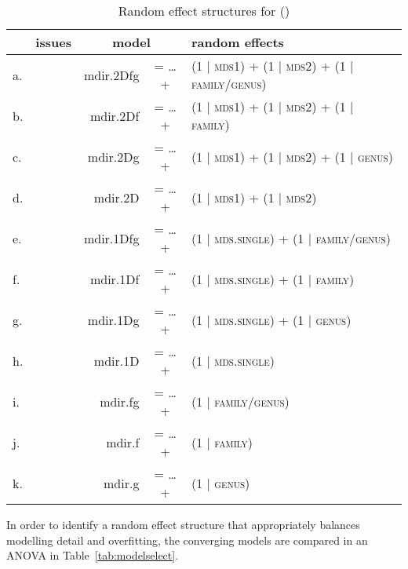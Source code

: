 \documentclass[A4paper]{article}
\begin{document}
\begin{table}[htb!]
\centering
\caption{Random effect structures for (\lastx) \label{tab:randommodels}}
\begin{tabular}{lrrcl}
   & issues 	& \multicolumn{2}{c}{model} & random effects\\
\midrule 
a. & 		& mdir.2Dfg & = \ldots + & (1 | \textsc{mds1}) + (1 | \textsc{mds2}) + (1 | \textsc{family}/\textsc{genus}) \\
b. & \ljudge{*} & mdir.2Df  & = \ldots + & (1 | \textsc{mds1}) + (1 | \textsc{mds2}) + (1 | \textsc{family})\\
c. &  		& mdir.2Dg  & = \ldots + & (1 | \textsc{mds1}) + (1 | \textsc{mds2}) + (1 | \textsc{genus})\\
d. & \ljudge{!} & mdir.2D   & = \ldots + & (1 | \textsc{mds1}) + (1 | \textsc{mds2}) \\
e. & \ljudge{!} & mdir.1Dfg & = \ldots + & (1 | \textsc{mds.single}) + (1 | \textsc{family}/\textsc{genus})\\
f. & 		& mdir.1Df  & = \ldots + & (1 | \textsc{mds.single}) + (1 | \textsc{family})\\
g. & 	 	& mdir.1Dg  & = \ldots + & (1 | \textsc{mds.single}) + (1 | \textsc{genus})\\
h. & \ljudge{!} & mdir.1D   & = \ldots + & (1 | \textsc{mds.single})\\
i. &  		& mdir.fg   & = \ldots + & (1 | \textsc{family}/\textsc{genus})\\
j. & 		& mdir.f    & = \ldots + & (1 | \textsc{family})\\
k. & 		& mdir.g    & = \ldots + & (1 | \textsc{genus})\\
\end{tabular}
\end{table}

In order to identify a random effect structure that appropriately balances modelling detail and overfitting, the converging models are compared in an ANOVA in Table~\ref{tab:modelselect}. 
\end{document}
